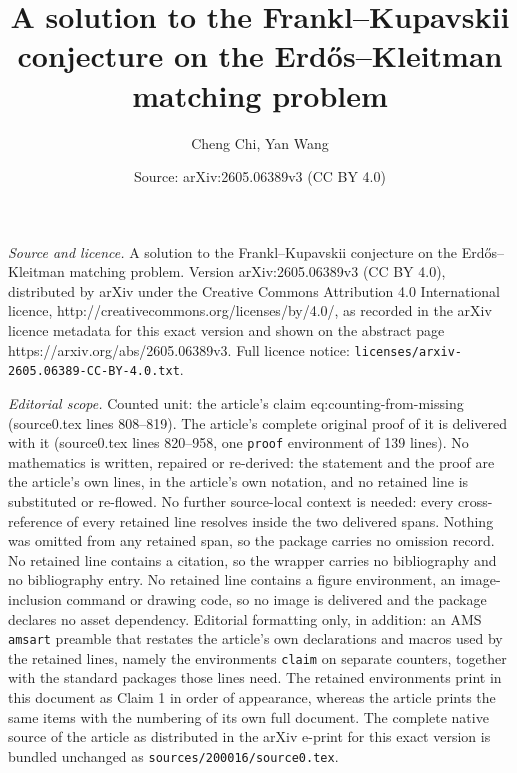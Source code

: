 \documentclass[10pt,a4paper]{amsart}
\title{A solution to the Frankl--Kupavskii conjecture on the Erd\H{o}s--Kleitman matching problem}
\author{Cheng Chi, Yan Wang}
\date{Source: arXiv:2605.06389v3 (CC BY 4.0)}
\newtheorem{claim}{Claim}
\begin{document}
\maketitle

\noindent\emph{Source and licence.} A solution to the Frankl--Kupavskii conjecture on the Erd\H{o}s--Kleitman matching problem. Version arXiv:2605.06389v3 (CC BY 4.0), distributed by arXiv under the Creative Commons Attribution 4.0 International licence, http://creativecommons.org/licenses/by/4.0/, as recorded in the arXiv licence metadata for this exact version and shown on the abstract page https://arxiv.org/abs/2605.06389v3. Full licence notice: \texttt{licenses/arxiv-2605.06389-CC-BY-4.0.txt}.\par\smallskip

\noindent\textit{Editorial scope.} Counted unit: the article's claim eq:counting-from-missing (source0.tex lines 808--819). The article's complete original proof of it is delivered with it (source0.tex lines 820--958, one \texttt{proof} environment of 139 lines). No mathematics is written, repaired or re-derived: the statement and the proof are the article's own lines, in the article's own notation, and no retained line is substituted or re-flowed.  No further source-local context is needed: every cross-reference of every retained line resolves inside the two delivered spans.  Nothing was omitted from any retained span, so the package carries no omission record.  No retained line contains a citation, so the wrapper carries no bibliography and no bibliography entry.  No retained line contains a figure environment, an image-inclusion command or drawing code, so no image is delivered and the package declares no asset dependency.  Editorial formatting only, in addition: an AMS \texttt{amsart} preamble that restates the article's own declarations and macros used by the retained lines, namely the environments \texttt{claim} on separate counters, together with the standard packages those lines need.  The retained environments print in this document as Claim 1 in order of appearance, whereas the article prints the same items with the numbering of its own full document.  The complete native source of the article as distributed in the arXiv e-print for this exact version is bundled unchanged as \texttt{sources/200016/source0.tex}.
\end{document}

